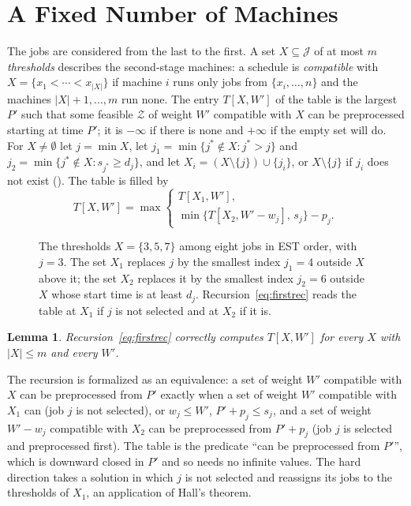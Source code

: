 \documentclass[11pt,a4paper]{article}
\newtheorem{lemma}{Lemma}
\theoremstyle{definition}
\theoremstyle{plain}
\newcommand{\calJ}{\mathcal{J}}
\newcommand{\calZ}{\mathcal{Z}}
\begin{document}
\section{A Fixed Number of Machines}\label{sec:FixNumMachines}

The jobs are considered from the last to the first. A set $X\subseteq\calJ$ of at most $m$
\emph{thresholds} describes the second-stage machines: a schedule is \emph{compatible} with
$X=\{x_1<\cdots<x_{|X|}\}$ if machine $i$ runs only jobs from $\{x_i,\ldots,n\}$ and the
machines $|X|+1,\ldots,m$ run none. The entry $T[X,W']$ of the table is the largest $P'$ such
that some feasible $\calZ$ of weight $W'$ compatible with $X$ can be preprocessed starting at
time $P'$; it is $-\infty$ if there is none and $+\infty$ if the empty set will do. For
$X\neq\emptyset$
let $j=\min X$, let $j_1=\min\{j^*\notin X: j^*>j\}$ and $j_2=\min\{j^*\notin X: s_{j^*}\ge
d_j\}$, and let $X_i=(X\setminus\{j\})\cup\{j_i\}$, or $X\setminus\{j\}$ if $j_i$ does not
exist (). The table is filled by
\begin{equation}\label{eq:firstrec}
T[X,W']=\max\begin{cases}
T[X_1,W'],\\
\min\{T[X_2,W'-w_j],\,s_j\}-p_j.
\end{cases}
\end{equation}

\begin{figure}[tb]
    \centering
    
    \caption{The thresholds $X=\{3,5,7\}$ among eight jobs in EST order, with $j=3$. The set
    $X_1$ replaces $j$ by the smallest index $j_1=4$ outside $X$ above it; the set $X_2$
    replaces it by the smallest index $j_2=6$ outside $X$ whose start time is at least $d_j$.
    Recursion~\eqref{eq:firstrec} reads the table at $X_1$ if $j$ is not selected and at $X_2$
    if it is.}
    \label{fig:thresholds}
\end{figure}

\begin{lemma}\label{lem:mainDP}
Recursion~\eqref{eq:firstrec} correctly computes $T[X,W']$ for every $X$ with $|X|\le m$ and
every $W'$.
\end{lemma}
The recursion is formalized as an equivalence: a set of weight $W'$ compatible with $X$ can be
preprocessed from $P'$ exactly when a set of weight $W'$ compatible with $X_1$ can (job $j$ is
not selected), or $w_j\le W'$, $P'+p_j\le s_j$, and a set of weight $W'-w_j$ compatible with
$X_2$ can be preprocessed from $P'+p_j$ (job $j$ is selected and preprocessed first). The table
is the predicate ``can be preprocessed from $P'$'', which is downward closed in $P'$ and so
needs no infinite values. The hard direction takes a solution in which $j$ is not selected and
reassigns its jobs to the thresholds of $X_1$, an application of Hall's theorem.
\end{document}
